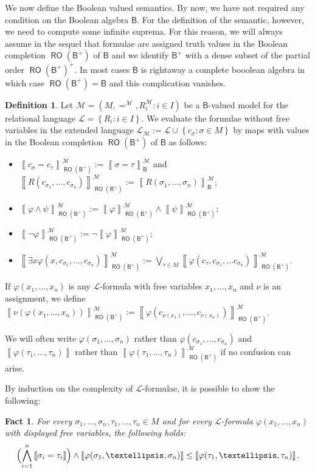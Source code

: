 \documentclass[11pt]{amsart}
\newcommand{\nphi}{\varphi}
\newcommand{\LL}{\mathcal{L}}
\theoremstyle{plain}
\newtheorem{fact}[theorem]{Fact}
\theoremstyle{definition}
\newtheorem{definition}[theorem]{Definition}
\theoremstyle{plain}
\theoremstyle{remark}
\newcommand{\M}{\mathcal{M}}
\DeclareMathOperator{\RO}{\mathsf{RO}}
\newcommand{\bool}[1]{\mathsf{#1}}
\newcommand{\cp}[1]{\left( #1 \right)}
\newcommand{\Qp}[1]{\left\llbracket #1 \right\rrbracket}
\newcommand{\bp}[1]{\left\lbrace #1 \right\rbrace}
\newcommand{\0}{\mathsf{0}}
\renewcommand{\1}{\mathsf{1}}
\renewcommand{\2}{\mathsf{2}}
\theoremstyle{definition}
\begin{document}
We now define the Boolean valued semantics. By now, we have not required any condition on the Boolean algebra $\bool{B}$. 
 For the definition of the semantic, however, we need to compute some infinite suprema. For this reason, we will always assume in the sequel that formulae are assigned truth values in the Boolean completion $\RO(\bool{B}^+)$ of $\bool{B}$ and we identify 
 $\bool{B}^+$ with a dense subset of the partial order $\RO(\bool{B}^+)^+$. In most cases $\bool{B}$ is rightaway a complete booolean algebra in which case
$\RO(\bool{B}^+)=\bool{B}$ and this complication vanishes.
\begin{definition}
Let $\M=\cp{M, =^\M, R^\M_i: i\in I}$ be a $\bool{B}$-valued model for the relational language $\LL=\bp{R_i: i\in I}$. We evaluate the formulae without free variables in the extended language $\LL_\M:=\LL\cup\bp{c_\sigma: \sigma\in M}$
by maps with values in the Boolean completion $\RO(\bool{B}^+)$ of $\bool{B}$ as follows:
\begin{itemize}
\item $\Qp{c_\sigma=c_\tau}^{\M}_{\RO(\bool{B}^+)}:=\Qp{\sigma=\tau}^\M_\bool{B}$ and 
$\Qp{R(c_{\sigma_1}, \dots, c_{\sigma_n})}^{\M}_{\RO(\bool{B}^+)}:=\Qp{R(\sigma_1, \dots, \sigma_n)}^\M_\bool{B}$;
\item $\Qp{\nphi\wedge\psi}^{\M}_{\RO(\bool{B}^+)}:=
\Qp{\nphi}^\M_{\RO(\bool{B}^+)}\wedge\Qp{\psi}^\M_{\RO(\bool{B}^+)}$;
\item $\Qp{\neg\nphi}^\M_{\RO(\bool{B}^+)}:=\neg\Qp{\nphi}^\M_{\RO(\bool{B}^+)}$;
\item $\Qp{\exists x\nphi(x, c_{\sigma_1}, \dots, c_{\sigma_n})}^\M_{\RO(\bool{B}^+)}:=
\bigvee_{\tau\in M}\Qp{\nphi(c_\tau, c_{\sigma_1}, \dots c_{\sigma_n})}^\M_{\RO(\bool{B}^+)}.$
\end{itemize}
If $\nphi(x_1, \dots, x_n)$ is any $\LL$-formula with free variables $x_1, \dots, x_n$ and $\nu$ is an assignment, we define $\Qp{\nu(\nphi(x_1, \dots, x_n))}^\M_{\RO(\bool{B}^+)}:=
\Qp{\nphi(c_{\nu(x_1)}, \dots, c_{\nu(x_n)})}^\M_{\RO(\bool{B}^+)}$.
\end{definition}
We will often write $\nphi(\sigma_1, \dots, \sigma_n)$ rather than $\nphi(c_{\sigma_1}, \dots, c_{\sigma_n})$
and $\Qp{\nphi(\tau_1, \dots, \tau_n)}$ rather than $\Qp{\nphi(\tau_1, \dots, \tau_n)}^\M_{\RO(\bool{B}^+)}$ if
no confusion can arise.

By induction on the complexity of $\LL$-formulae, it is possible to show the following:
\begin{fact}
For every $\sigma_1, \dots, \sigma_n, \tau_1, \dots, \tau_n\in M$ and for every $\LL$-formula $\nphi(x_1, \dots, x_n)$ with displayed free variables, the following holds:
\begin{equation}
\Bigl(\bigwedge_{i=1}^n\Qp{\sigma_i=\tau_i}\Bigr)\wedge\Qp{\nphi(\sigma_1, \dots, \sigma_n)}
\leq\Qp{\nphi(\tau_1, \dots, \tau_n)}.
\end{equation}
\end{fact}
\end{document}
